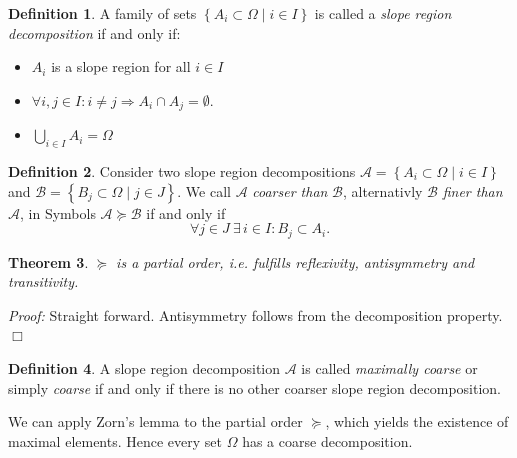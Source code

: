 \documentclass[11pt,twoside,twocolumn,a4paper]{article}
\theoremstyle{plain}
\newtheorem{thm}{Theorem}[section] %
\theoremstyle{definition}
\newtheorem{defn}[thm]{Definition} %
\begin{document}
\begin{defn}
A family of sets $\left\{ A_i \subset \Omega \mid i \in I \right\}$ is called a \emph{slope region decomposition} if and only if:
\begin{itemize}
\item $A_i$ is a slope region for all $i \in I$
\item $\forall i,j \in I: i \neq j \Rightarrow A_i \cap A_j = \emptyset$.
\item $\bigcup_{i\in I} A_i = \Omega$
\end{itemize}
\end{defn}



\begin{defn}
Consider two slope region decompositions $\mathcal{A} = \left\{ A_i \subset \Omega \mid i \in I \right\}$ and $\mathcal{B} = \left\{ B_j \subset \Omega \mid j \in J \right\}$.
We call $\mathcal{A}$ \emph{coarser than} $\mathcal{B}$, alternativly $\mathcal{B}$ \emph{finer than} $\mathcal{A}$, in Symbols $\mathcal{A} \succeq \mathcal{B}$ if and only if
\begin{equation*}
\forall j \in J ~ \exists \, i \in I: B_j \subset A_i.
\end{equation*}
\end{defn}

\begin{thm}
$\succeq$ is a partial order, i.e. fulfills reflexivity, antisymmetry and transitivity.
\end{thm}
\emph{Proof:} Straight forward. Antisymmetry follows from the decomposition property. \hfill $\Box$

\begin{defn}
A slope region decomposition $\mathcal{A}$ is called \emph{maximally coarse} or simply \emph{coarse} if and only if there is no other coarser slope region decomposition.
\end{defn}

We can apply Zorn's lemma \cite{zorn1935remark} to the partial order $\succeq$, which yields the existence of maximal elements.
Hence every set $\Omega$ has a coarse decomposition.
\end{document}
